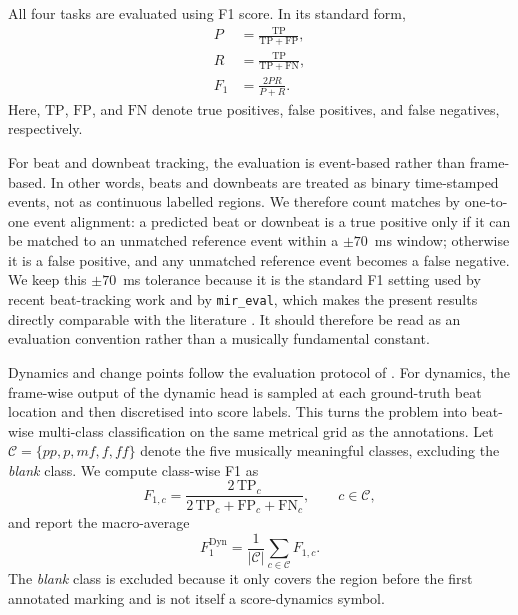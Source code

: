 All four tasks are evaluated using F1 score. In its standard form,
\begin{align}
P &= \frac{\mathrm{TP}}{\mathrm{TP}+\mathrm{FP}},
\label{eq:audiodyn_precision}\\
R &= \frac{\mathrm{TP}}{\mathrm{TP}+\mathrm{FN}},
\label{eq:audiodyn_recall}\\
F_{1} &= \frac{2PR}{P+R}.
\label{eq:audiodyn_f1}
\end{align}
Here, $\mathrm{TP}$, $\mathrm{FP}$, and $\mathrm{FN}$ denote true positives, false positives, and false negatives, respectively.

For beat and downbeat tracking, the evaluation is event-based rather than frame-based. In other words, beats and downbeats are treated as binary time-stamped events, not as continuous labelled regions. We therefore count matches by one-to-one event alignment: a predicted beat or downbeat is a true positive only if it can be matched to an unmatched reference event within a $\pm 70$~ms window; otherwise it is a false positive, and any unmatched reference event becomes a false negative. We keep this $\pm 70$~ms tolerance because it is the standard F1 setting used by recent beat-tracking work and by \texttt{mir\_eval}, which makes the present results directly comparable with the literature \cite{raffel2014mireval,bock2020deconstruct,foscarin2024beat}. It should therefore be read as an evaluation convention rather than a musically fundamental constant.

Dynamics and change points follow the evaluation protocol of \cite{kosta2017thesis}. For dynamics, the frame-wise output of the dynamic head is sampled at each ground-truth beat location and then discretised into score labels. This turns the problem into beat-wise multi-class classification on the same metrical grid as the annotations. Let $\mathcal{C}=\{\textit{pp},\textit{p},\textit{mf},\textit{f},\textit{ff}\}$ denote the five musically meaningful classes, excluding the \textit{blank} class. We compute class-wise F1 as
\begin{equation}
F_{1,c}
=
\frac{2\,\mathrm{TP}_{c}}{2\,\mathrm{TP}_{c}+\mathrm{FP}_{c}+\mathrm{FN}_{c}},
\qquad c \in \mathcal{C},
\label{eq:audiodyn_classwise_f1}
\end{equation}
and report the macro-average
\begin{equation}
F_{1}^{\mathrm{Dyn}}
=
\frac{1}{|\mathcal{C}|}
\sum_{c\in\mathcal{C}} F_{1,c}.
\label{eq:audiodyn_macro_f1}
\end{equation}
The \textit{blank} class is excluded because it only covers the region before the first annotated marking and is not itself a score-dynamics symbol.


